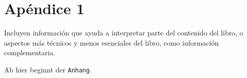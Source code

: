 \chapter{Ap\'endice 1}\label{apendice1}

Incluyen información que ayuda a interpretar parte del contenido del libro, o aspectos más técnicos y menos esenciales del libro, como información complementaria.


\bigskip

Ab hier beginnt der \verb|Anhang|.






\endinput 